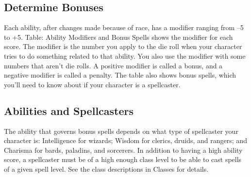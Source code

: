 \subsection{Determine Bonuses}

				
Each ability, after changes made because of race, has a modifier ranging from --5 to +5. Table: Ability Modifiers and Bonus Spells shows the modifier for each score. The modifier is the number you apply to the die roll when your character tries to do something related to that ability. You also use the modifier with some numbers that aren't die rolls. A positive modifier is called a bonus, and a negative modifier is called a penalty. The table also shows bonus spells, which you'll need to know about if your character is a spellcaster.
				
\subsection{Abilities and Spellcasters}

				
The ability that governs bonus spells depends on what type of spellcaster your character is: Intelligence for wizards; Wisdom for clerics, druids, and rangers; and Charisma for bards, paladins, and sorcerers. In addition to having a high ability score, a spellcaster must be of a high enough class level to be able to cast spells of a given spell level. See the class descriptions in Classes for details.

